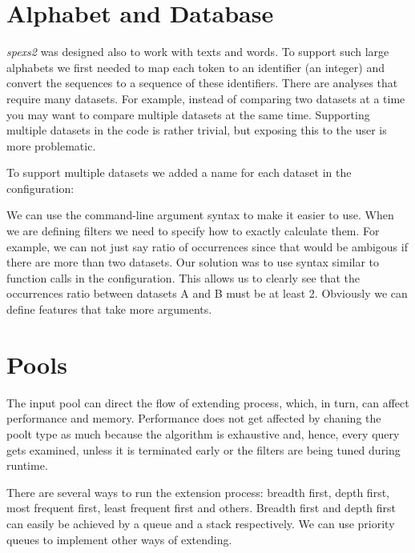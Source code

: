\section{Alphabet and Database}

\emph{spexs2} was designed also to work with texts and words. To support such large alphabets we first needed to map each token to an identifier (an integer) and convert the sequences to a sequence of these identifiers. There are analyses that require many datasets. For example, instead of comparing two datasets at a time you may want to compare multiple datasets at the same time. Supporting multiple datasets in the code is rather trivial, but exposing this to the user is more problematic.

To support multiple datasets we added a name for each dataset in the configuration:

\begin{file}
"Datasets" : {
    "A" : { "File" : "$A$" },
    "B" : { "File" : "$B$" },
    "C" : { "File" : "$C$" },
    ...
\end{file}

We can use the command-line argument syntax to make it easier to use. When we are defining filters we need to specify how to exactly calculate them. For example, we can not just say ratio of occurrences since that would be ambigous if there are more than two datasets. Our solution was to use syntax similar to function calls in the configuration. This allows us to clearly see that the occurrences ratio between datasets A and B must be at least 2. Obviously we can define features that take more arguments.

\begin{file}
...
"Extension": {
    "Outputtable": {
        "OccurencesRatio(A, B)" : {"min" : 2},
        ...
\end{file}

\section{Pools}

The input pool can direct the flow of extending process, which, in turn, can affect performance and memory. Performance does not get affected by chaning the poolt type as much because the algorithm is exhaustive and, hence, every query gets examined, unless it is terminated early or the filters are being tuned during runtime.

There are several ways to run the extension process: breadth first, depth first, most frequent first, least frequent first and others. Breadth first and depth first can easily be achieved by a queue and a stack respectively. We can use priority queues to implement other ways of extending.

